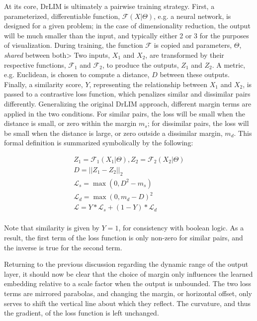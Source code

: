 At its core, DrLIM is ultimately a pairwise training strategy.
First, a parameterized, differentiable function, $\mathcal{F}(X | \Theta)$, e.g. a neural network, is designed for a given problem;
in the case of dimensionality reduction, the output will be much smaller than the input, and typically either 2 or 3 for the purposes of visualization.
During training, the function $\mathcal{F}$ is copied and parameters, $\Theta$, \emph{shared} between both> %
Two inputs, $X_1$ and $X_2$, are transformed by their respective functions, $\mathcal{F}_1$ and $\mathcal{F}_2$, to produce the outputs, $Z_1$ and $Z_2$.
A metric, e.g. Euclidean, is chosen to compute a distance, $D$ between these outputs.
Finally, a similarity score, $Y$, representing the relationship between $X_1$ and $X_2$, is passed to a contrastive loss function, which penalizes similar and dissimilar pairs differently.
Generalizing the original DrLIM approach, different margin terms are applied in the two conditions.
For similar pairs, the loss will be small when the distance is small, or zero within the margin $m_s$;
for dissimilar pairs, the loss will be small when the distance is large, or zero outside a dissimilar margin, $m_d$.
This formal definition is summarized symbolically by the following:


\begin{align*}
Z_1 = \mathcal{F}_1(X_1 | \Theta), Z_2 = \mathcal{F}_2(X_2 | \Theta)\\
D = || Z_1 - Z_2 ||_2\\
\mathcal{L}_{s} = \max(0, D^2 - m_{s})\\
\mathcal{L}_{d} = \max(0, m_{d} - D)^2\\
\mathcal{L} = Y * \mathcal{L}_{s} + (1 - Y) * \mathcal{L}_{d} \\
\end{align*}

\noindent Note that similarity is given by $Y=1$, for consistency with boolean logic.
As a result, the first term of the loss function is only non-zero for similar pairs, and the inverse is true for the second term.

Returning to the previous discussion regarding the dynamic range of the output layer, it should now be clear that the choice of margin only influences the learned embedding relative to a scale factor when the output is unbounded.
The two loss terms are mirrored parabolas, and changing the margin, or horizontal offset, only serves to shift the vertical line about which they reflect.
The curvature, and thus the gradient, of the loss function is left unchanged.

